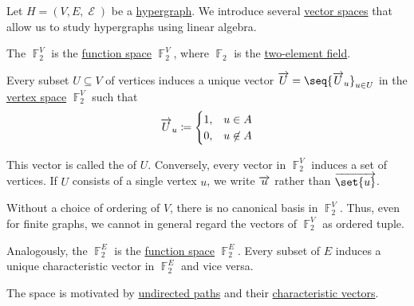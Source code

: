 \begin{definition}\label{def:hypergraph_vector_spaces}
  Let \( H = (V, E, \mscrE) \) be a \hyperref[def:graph]{hypergraph}. We introduce several \hyperref[def:vector_space]{vector spaces} that allow us to study hypergraphs using linear algebra.

  \begin{thmenum}
     The  \( \BbbF_2^V \) is the \hyperref[thm:functions_over_ring_form_algebra]{function space} \( \BbbF_2^V \), where \( \BbbF_2 \) is the \hyperref[thm:f2_is_boolean_algebra]{two-element field}.

    Every subset \( U \subseteq V \) of vertices induces a unique vector \( \vect{U} = \seq{ \vect{U}_u }_{u \in U} \) in the \hyperref[def:hypergraph_vector_spaces/vertex]{vertex space} \( \BbbF_2^V \) such that
    \begin{equation*}
      \overrightarrow{U}_u \coloneqq \begin{cases}
        1, &u \in A \\
        0, &u \not\in A
      \end{cases}
    \end{equation*}

    This vector is called the  of \( U \). Conversely, every vector in \( \BbbF_2^V \) induces a set of vertices. If \( U \) consists of a single vertex \( u \), we write \( \overrightarrow{u} \) rather than \( \vect{\set{u}} \).

    Without a choice of ordering of \( V \), there is no canonical basis in \( \BbbF_2^V \). Thus, even for finite graphs, we cannot in general regard the vectors of \( \BbbF_2^V \) as ordered tuple.

     Analogously, the  \( \BbbF_2^E \) is the \hyperref[thm:functions_over_ring_form_algebra]{function space} \( \BbbF_2^E \). Every subset of \( E \) induces a unique characteristic vector in \( \BbbF_2^E \) and vice versa.

    The space is motivated by \hyperref[def:undirected_multigraph_path]{undirected paths} and their \hyperref[def:undirected_multigraph_path/characteristic_vector]{characteristic vectors}.
  \end{thmenum}
\end{definition}

